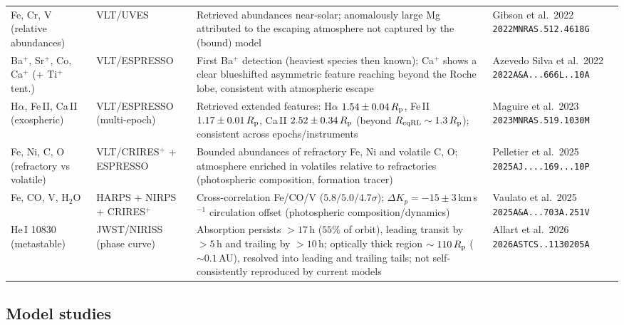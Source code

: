 \begin{longtable}{@{}>{\raggedright\arraybackslash}p{2.4cm}>{\raggedright\arraybackslash}p{2.3cm}>{\raggedright\arraybackslash}p{5.0cm}>{\raggedright\arraybackslash}p{3.2cm}@{}}
Fe, Cr, V (relative abundances) & VLT/UVES &
Retrieved abundances near-solar; anomalously large Mg attributed to the
escaping atmosphere not captured by the (bound) model &
Gibson et al.\ 2022 \texttt{2022MNRAS.512.4618G} \\
Ba$^{+}$, Sr$^{+}$, Co, Ca$^{+}$ (+ Ti$^{+}$ tent.) & VLT/\allowbreak ESPRESSO &
First Ba$^{+}$ detection (heaviest species then known); Ca$^{+}$ shows a clear
blueshifted asymmetric feature reaching beyond the Roche lobe, consistent with
atmospheric escape &
Azevedo Silva et al.\ 2022 \texttt{2022A\&A...666L..10A} \\
H$\alpha$, Fe\,II, Ca\,II (exospheric) & VLT/\allowbreak ESPRESSO (multi-epoch) &
Retrieved extended features: H$\alpha$ $1.54\pm0.04\,R_{\rm p}$, Fe\,II
$1.17\pm0.01\,R_{\rm p}$, Ca\,II $2.52\pm0.34\,R_{\rm p}$ (beyond $R_{\rm eqRL}\sim1.3\,R_{\rm p}$);
consistent across epochs/instruments &
Maguire et al.\ 2023 \texttt{2023MNRAS.519.1030M} \\
Fe, Ni, C, O (refractory vs volatile) & VLT/CRIRES$^{+}$ + ESPRESSO &
Bounded abundances of refractory Fe, Ni and volatile C, O; atmosphere enriched
in volatiles relative to refractories (photospheric composition, formation
tracer) &
Pelletier et al.\ 2025 \texttt{2025AJ....169...10P} \\
Fe, CO, V, H$_2$O & HARPS + NIRPS + CRIRES$^{+}$ &
Cross-correlation Fe/CO/V ($5.8/5.0/4.7\sigma$); $\Delta K_p=-15\pm3$\,km\,s$^{-1}$
circulation offset (photospheric composition/dynamics) &
Vaulato et al.\ 2025 \texttt{2025A\&A...703A.251V} \\
He\,I 10830 (metastable) & JWST/NIRISS (phase curve) &
Absorption persists $>17$\,h ($55\%$ of orbit), leading transit by $>5$\,h and
trailing by $>10$\,h; optically thick region $\sim110\,R_{\rm p}$ ($\sim0.1$\,AU),
resolved into leading and trailing tails; not self-consistently reproduced by
current models &
Allart et al.\ 2026 \texttt{2026ASTCS..1130205A} \\
\end{longtable}
\endgroup

\subsection{Model studies}

